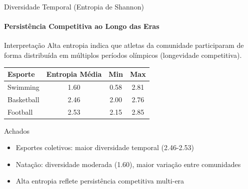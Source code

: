 \begin{frame}{Diversidade Temporal (Entropia de Shannon)}
    \framesubtitle{Persistência Competitiva ao Longo das Eras}
    \begin{block}{Interpretação}
        Alta entropia indica que atletas da comunidade participaram de forma distribuída em múltiplos períodos olímpicos (longevidade competitiva).
    \end{block}

    \begin{table}[h]
        \centering
        \footnotesize
        \begin{tabular}{lccc}
            \toprule
            \textbf{Esporte} & \textbf{Entropia Média} & \textbf{Min} & \textbf{Max} \\
            \midrule
            Swimming & 1.60 & 0.58 & 2.81 \\
            Basketball & 2.46 & 2.00 & 2.76 \\
            Football & 2.53 & 2.15 & 2.85 \\
            \bottomrule
        \end{tabular}
    \end{table}

    \vspace{0.1cm}
    \begin{block}{Achados}
        \footnotesize
        \begin{itemize}
            \item Esportes coletivos: maior diversidade temporal (2.46-2.53)
            \item Natação: diversidade moderada (1.60), maior variação entre comunidades
            \item Alta entropia reflete persistência competitiva multi-era
        \end{itemize}
    \end{block}
\end{frame}

